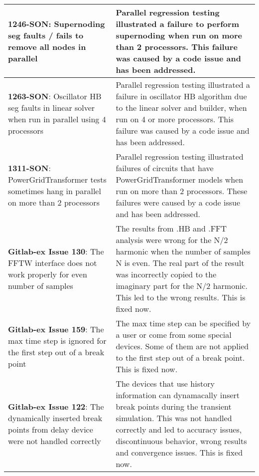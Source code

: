 {\begin{longtable}[h] {>{\raggedright\small}m{2in}|>{\raggedright\let\\\tabularnewline\small}m{3.5in}}
\textbf{1246-SON}: Supernoding seg faults / fails to remove all nodes in parallel &
Parallel regression testing illustrated a failure to perform
supernoding when run on more than 2 processors.  This failure was
caused by a code issue and has been addressed.
\\ \hline

\textbf{1263-SON}: Oscillator HB seg faults in linear solver when run in parallel using 4 processors &
Parallel regression testing illustrated a failure in oscillator HB
algorithm due to the linear solver and builder, when run on 4 or more
processors.  This failure was caused by a code issue and has been
addressed.
\\ \hline

\textbf{1311-SON}: PowerGridTransformer tests sometimes hang in parallel on more than 2 processors &
Parallel regression testing illustrated failures of circuits that have
PowerGridTransformer models when run on more than 2 processors.  These
failures were caused by a code issue and has been addressed.
\\ \hline

\textbf{Gitlab-ex Issue 130}: The FFTW interface does not work properly for even number of samples  &
The results from .HB and .FFT analysis were wrong for the N/2 harmonic
when the number of samples N is even. The real part of the result was
incorrectly copied to the imaginary part for the N/2 harmonic.  This
led to the wrong results. This is fixed now.
\\ \hline


\textbf{Gitlab-ex Issue 159}: The max time step is ignored for the first step out of a break point &
The max time step can be specified by a user or come from some special
devices. Some of them are not applied to the first step out of a break
point. This is fixed now.
\\ \hline

\textbf{Gitlab-ex Issue 122}: The dynamically inserted break points from delay device were not handled correctly &
The devices that use history information can dynamacally insert break
points during the transient simulation. This was not handled correctly
and led to accuracy issues, discontinuous behavior, wrong results and
convergence issues.  This is fixed now.
\\ \hline


\end{longtable}
}
